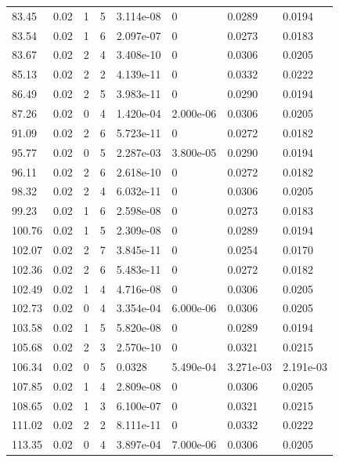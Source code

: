 \documentclass[preview]{standalone}
\begin{document}
{{{\begin{tabular}{L{1.2cm}C{1.2cm} C{0.3cm}C{0.5cm} C{1.4cm}C{1.4cm} C{1.4cm}C{1.4cm}}
  83.45  &  0.02  & 1     &  5 &  3.114e-08  & 0  & 0.0289 &  0.0194   \\ 
  83.54  &  0.02  & 1     &  6 &  2.097e-07  & 0  & 0.0273 &  0.0183   \\ 
  83.67  &  0.02  & 2     &  4 &  3.408e-10  & 0  & 0.0306 &  0.0205   \\ 
  85.13  &  0.02  & 2     &  2 &  4.139e-11  & 0  & 0.0332 &  0.0222   \\ 
  86.49  &  0.02  & 2     &  5 &  3.983e-11  & 0  & 0.0290 &  0.0194   \\ 
  87.26  &  0.02  & 0     &  4 &  1.420e-04  & 2.000e-06  & 0.0306 &  0.0205   \\ 
  91.09  &  0.02  & 2     &  6 &  5.723e-11  & 0  & 0.0272 &  0.0182   \\ 
  95.77  &  0.02  & 0     &  5 &  2.287e-03  & 3.800e-05  & 0.0290 &  0.0194   \\ 
  96.11  &  0.02  & 2     &  6 &  2.618e-10  & 0  & 0.0272 &  0.0182   \\ 
  98.32  &  0.02  & 2     &  4 &  6.032e-11  & 0  & 0.0306 &  0.0205   \\ 
  99.23  &  0.02  & 1     &  6 &  2.598e-08  & 0  & 0.0273 &  0.0183   \\ 
  100.76  &  0.02  & 1     &  5 &  2.309e-08  & 0  & 0.0289 &  0.0194   \\ 
  102.07  &  0.02  & 2     &  7 &  3.845e-11  & 0  & 0.0254 &  0.0170   \\ 
  102.36  &  0.02  & 2     &  6 &  5.483e-11  & 0  & 0.0272 &  0.0182   \\ 
  102.49  &  0.02  & 1     &  4 &  4.716e-08  & 0  & 0.0306 &  0.0205   \\ 
  102.73  &  0.02  & 0     &  4 &  3.354e-04  & 6.000e-06  & 0.0306 &  0.0205   \\ 
  103.58  &  0.02  & 1     &  5 &  5.820e-08  & 0  & 0.0289 &  0.0194   \\ 
  105.68  &  0.02  & 2     &  3 &  2.570e-10  & 0  & 0.0321 &  0.0215   \\ 
  106.34  &  0.02  & 0     &  5 &  0.0328  & 5.490e-04  & 3.271e-03 &  2.191e-03   \\ 
  107.85  &  0.02  & 1     &  4 &  2.809e-08  & 0  & 0.0306 &  0.0205   \\ 
  108.65  &  0.02  & 1     &  3 &  6.100e-07  & 0  & 0.0321 &  0.0215   \\ 
  111.02  &  0.02  & 2     &  2 &  8.111e-11  & 0  & 0.0332 &  0.0222   \\ 
  113.35  &  0.02  & 0     &  4 &  3.897e-04  & 7.000e-06  & 0.0306 &  0.0205   \\ 

\end{tabular}}}}
\end{document}
